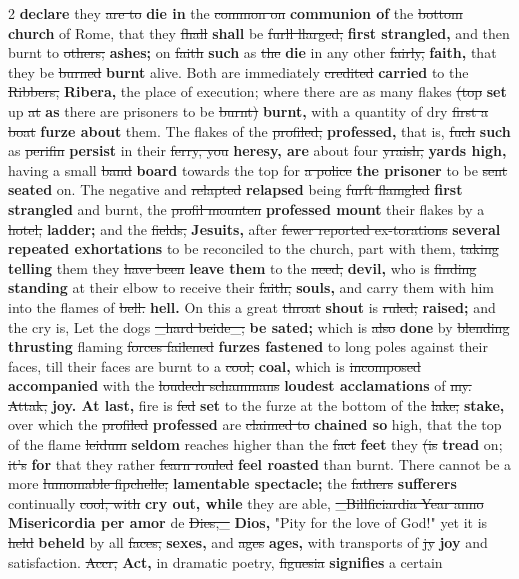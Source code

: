 \documentclass[10pt]{article}
\begin{document}
\begin{multicols}{2}
\textbf{declare} they \sout{are to} \textbf{die in} the \sout{common on} \textbf{communion of} the \sout{bottom} \textbf{church} of Rome, that they \sout{fhall} \textbf{shall} be \sout{furll llarged,} \textbf{first strangled,} and then burnt to \sout{others;} \textbf{ashes;} on \sout{faith} \textbf{such} as \sout{the} \textbf{die} in any other \sout{fairly,} \textbf{faith,} that they be \sout{burned} \textbf{burnt} alive. Both are immediately \sout{credited} \textbf{carried} to the \sout{Ribbers,} \textbf{Ribera,} the place of execution; where there are as many flakes \sout{(top} \textbf{set} up \sout{at} \textbf{as} there are prisoners to be \sout{burnt)} \textbf{burnt,} with a quantity of dry \sout{first a boat} \textbf{furze about} them. The flakes of the \sout{profiled,} \textbf{professed,} that is, \sout{fuch} \textbf{such} as \sout{perifin} \textbf{persist} in their \sout{ferry, you} \textbf{heresy, are} about four \sout{yraish,} \textbf{yards high,} having a small \sout{band} \textbf{board} towards the top for \sout{a police} \textbf{the prisoner} to be \sout{sent} \textbf{seated} on. The negative and \sout{relapted} \textbf{relapsed} being \sout{furft flamgled} \textbf{first strangled} and burnt, the \sout{profil mounten} \textbf{professed mount} their flakes by a \sout{hotel,} \textbf{ladder;} and the \sout{fields,} \textbf{Jesuits,} after \sout{fewer reported ex-torations} \textbf{several repeated exhortations} to be reconciled to the church, part with them, \sout{taking} \textbf{telling} them they \sout{have been} \textbf{leave them} to the \sout{need,} \textbf{devil,} who is \sout{finding} \textbf{standing} at their elbow to receive their \sout{faith,} \textbf{souls,} and carry them with him into the flames of \sout{bell.} \textbf{hell.} On this a great \sout{throat} \textbf{shout} is \sout{ruled;} \textbf{raised;} and the cry is, Let the dogs \sout{\_hard beide\_;} \textbf{be sated;} which is \sout{also} \textbf{done} by \sout{blending} \textbf{thrusting} flaming \sout{forces failened} \textbf{furzes fastened} to long poles against their faces, till their faces are burnt to a \sout{cool,} \textbf{coal,} which is \sout{incomposed} \textbf{accompanied} with the \sout{loudech schammans} \textbf{loudest acclamations} of \sout{my. Attak,} \textbf{joy. At last,} fire is \sout{fed} \textbf{set} to the furze at the bottom of the \sout{lake;} \textbf{stake,} over which the \sout{profiled} \textbf{professed} are \sout{claimed to} \textbf{chained so} high, that the top of the flame \sout{leidum} \textbf{seldom} reaches higher than the \sout{fact} \textbf{feet} they \sout{(is} \textbf{tread} on; \sout{it’s} \textbf{for} that they rather \sout{fearn rouled} \textbf{feel roasted} than burnt. There cannot be a more \sout{lumomable fipchelle;} \textbf{lamentable spectacle;} the \sout{fathers} \textbf{sufferers} continually \sout{cool, with} \textbf{cry out, while} they are able, \sout{\_Billficiardia Year anno} \textbf{Misericordia per amor} de \sout{Dies,\_} \textbf{Dios,} "Pity for the love of God!" yet it is \sout{held} \textbf{beheld} by all \sout{faces,} \textbf{sexes,} and \sout{ages} \textbf{ages,} with transports of \sout{jy} \textbf{joy} and satisfaction. \sout{Accr,} \textbf{Act,} in dramatic poetry, \sout{figuesia} \textbf{signifies} a certain 
\end{multicols}
\end{document}
